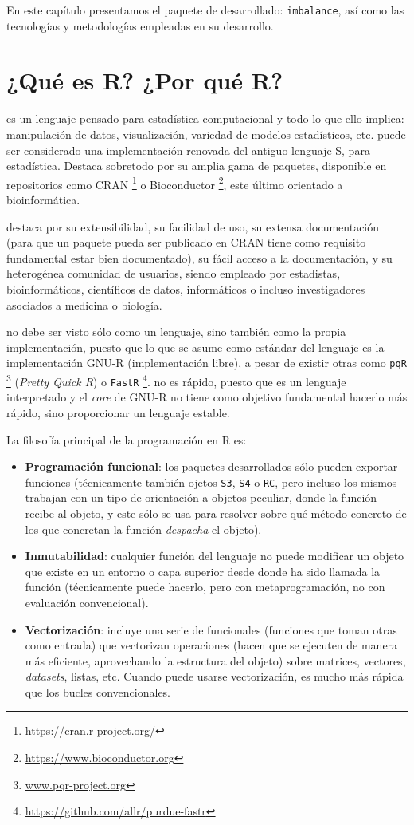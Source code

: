 En este capítulo presentamos el paquete de \R desarrollado: \texttt{imbalance}, así como las tecnologías y 
metodologías empleadas en su desarrollo.

\section{¿Qué es R? ¿Por qué R?}
 es un lenguaje pensado para estadística computacional y todo lo que ello implica: 
manipulación de datos, visualización, variedad de modelos estadísticos, etc. \R puede ser considerado una 
implementación renovada del antiguo lenguaje S, para estadística. Destaca sobretodo por su amplia gama de
paquetes, disponible en repositorios como CRAN \footnote{\url{https://cran.r-project.org/}} o 
Bioconductor \footnote{\url{https://www.bioconductor.org}}, este último orientado a bioinformática.

\R destaca por su extensibilidad, su facilidad de uso, su extensa documentación (para que un paquete pueda ser
publicado en CRAN tiene como requisito fundamental estar bien documentado), su fácil acceso a la documentación,
y su heterogénea comunidad de usuarios, siendo empleado por estadistas, bioinformáticos, científicos
de datos, informáticos o incluso investigadores asociados a medicina o biología.

\R no debe ser visto sólo como un lenguaje, sino también como la propia implementación, puesto que lo que se
asume como estándar del lenguaje es la implementación GNU-R (implementación libre), a pesar de existir otras 
como \texttt{pqR} \footnote{\url{www.pqr-project.org}} (\textit{Pretty Quick R}) o 
\texttt{FastR} \footnote{\url{https://github.com/allr/purdue-fastr}}. \R no es rápido, puesto que es un 
lenguaje interpretado y el \textit{core} de GNU-R no tiene como objetivo fundamental hacerlo más rápido, sino
proporcionar un lenguaje estable. 

La filosofía principal de la programación en R es:

\begin{itemize}
  \item \textbf{Programación funcional}: los paquetes desarrollados sólo pueden exportar funciones (técnicamente
  también ojetos \texttt{S3}, \texttt{S4} o \texttt{RC}, pero incluso los mismos trabajan con un tipo de orientación
  a objetos peculiar, donde la función recibe al objeto, y este sólo se usa para resolver sobre qué método concreto
  de los que concretan la función \textit{despacha} el objeto).
  \item \textbf{Inmutabilidad}: cualquier función del lenguaje no puede modificar un objeto que existe en
  un entorno o capa superior desde donde ha sido llamada la función (técnicamente puede hacerlo, pero con metaprogramación,
  no con evaluación convencional).
  \item \textbf{Vectorización}: \R incluye una serie de funcionales (funciones que toman otras como entrada) 
  que vectorizan operaciones (hacen que se ejecuten de manera más eficiente, aprovechando la estructura del objeto)
  sobre matrices, vectores, \textit{datasets}, listas, etc. Cuando puede usarse vectorización, es mucho más
  rápida que los bucles convencionales.
\end{itemize}

